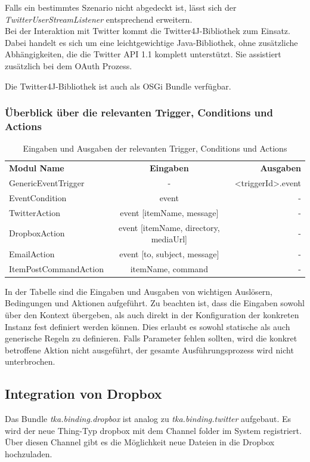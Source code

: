 Falls ein bestimmtes Szenario nicht abgedeckt ist, lässt sich der \textit{TwitterUserStreamListener} entsprechend erweitern.\\



Bei der Interaktion mit Twitter kommt die Twitter4J-Bibliothek\cite{twitter4j} zum Einsatz. Dabei handelt es sich um eine leichtgewichtige Java-Bibliothek, ohne zusätzliche Abhängigkeiten, die die Twitter API 1.1 komplett unterstützt. Sie assistiert zusätzlich bei dem OAuth Prozess. 

Die Twitter4J-Bibliothek ist auch als OSGi Bundle verfügbar.




\subsubsection{Überblick über die relevanten Trigger, Conditions und Actions}
\begin{table}[h]
\centering
\begin{tabular}{l|c|r}
	\textbf{Modul Name}  & \textbf{Eingaben} & \textbf{Ausgaben} \\
	GenericEventTrigger  & -        			&  <triggerId>.event   \\ 
    EventCondition		&	event   			&	-\\
    TwitterAction		&	event [itemName, message]	& 	-	\\
    DropboxAction		&	event [itemName, directory, mediaUrl]	& - \\
    EmailAction			&	event [to, subject, message]	& -\\
    ItemPostCommandAction	& itemName, command	& - \\
\end{tabular}
\caption{Eingaben und Ausgaben der relevanten Trigger, Conditions und Actions}
\label{table:io}
\end{table}

In der Tabelle sind die Eingaben und Ausgaben von wichtigen Auslösern, Bedingungen und Aktionen aufgeführt. Zu beachten ist, dass die Eingaben sowohl über den Kontext übergeben, als auch direkt in der Konfiguration der konkreten Instanz fest definiert werden können. Dies erlaubt es sowohl statische als auch generische Regeln zu definieren. Falls Parameter fehlen sollten, wird die konkret betroffene Aktion nicht ausgeführt, der gesamte Ausführungsprozess wird nicht unterbrochen.

\subsection{Integration von Dropbox}
Das Bundle \textit{tka.binding.dropbox} ist analog zu \textit{tka.binding.twitter} aufgebaut. Es wird der neue Thing-Typ \glqq dropbox\grqq{} mit dem Channel \glqq folder\grqq{} im System registriert. Über diesen Channel gibt es die Möglichkeit neue Dateien in die Dropbox hochzuladen. \\

